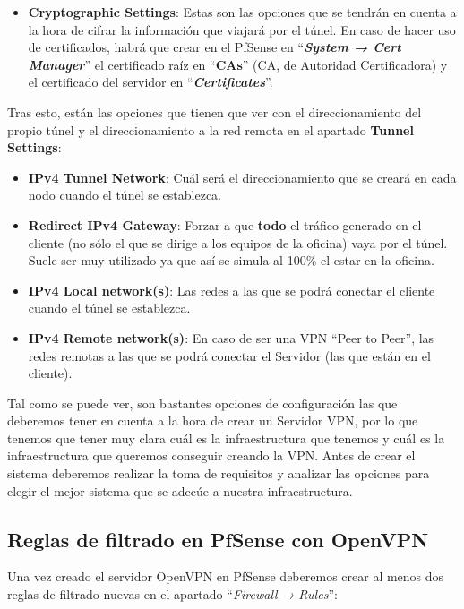 \begin{itemize}
    \item \textbf{Cryptographic Settings}: Estas son las opciones que se tendrán en cuenta a la hora de cifrar la información que viajará por el túnel. En caso de hacer uso de certificados, habrá que crear  en el PfSense en “\textbf{\textit{System → Cert Manager}}” el certificado raíz en “\textbf{CAs}” (CA, de Autoridad Certificadora) y el certificado del servidor en “\textbf{\textit{Certificates}}”.
\end{itemize}

Tras esto, están las opciones que tienen que ver con el direccionamiento del propio túnel y el direccionamiento a la red remota en el apartado \textbf{Tunnel Settings}:


\begin{itemize}
    \item \textbf{IPv4 Tunnel Network}: Cuál será el direccionamiento que se creará en cada nodo cuando el túnel se establezca.
    \item \textbf{Redirect IPv4 Gateway}: Forzar a que \textbf{todo} el tráfico generado en el cliente (no sólo el que se dirige a los equipos de la oficina)  vaya por el túnel. Suele ser muy utilizado ya que así se simula al 100\% el estar en la  oficina.
    \item \textbf{IPv4 Local network(s)}: Las redes a las que se podrá conectar el cliente cuando el túnel se establezca.
    \item \textbf{IPv4 Remote network(s)}: En caso de ser una VPN “Peer to Peer”, las redes remotas a las que se podrá conectar el Servidor (las que están en el cliente).
\end{itemize}

Tal como se puede ver, son bastantes opciones de configuración las que deberemos tener en cuenta a la hora de crear un Servidor VPN, por lo que tenemos que tener muy clara cuál es la infraestructura que tenemos y cuál es la infraestructura que queremos conseguir creando la VPN. Antes de crear el sistema deberemos realizar la toma de requisitos y analizar las opciones para elegir el mejor sistema que se adecúe a nuestra infraestructura.


\subsection{Reglas de filtrado en PfSense con OpenVPN}
Una vez creado el servidor OpenVPN en PfSense deberemos crear al menos dos reglas de filtrado nuevas en el apartado “\textit{Firewall → Rules}”:


